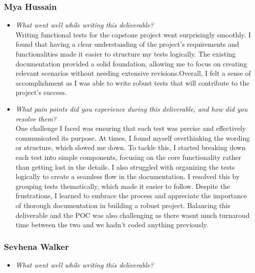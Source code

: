 \documentclass[12pt, titlepage]{article}
\begin{document}
\begin{appendices}
\subsubsection*{Mya Hussain}
\begin{itemize}
  \item \textit{What went well while writing this deliverable?} \\ 
  
  Writing functional tests for the capstone project went surprisingly 
  smoothly. I found that having a clear understanding of the project's 
  requirements and functionalities made it easier to structure my tests 
  logically. The existing documentation provided a solid foundation, 
  allowing me to focus on creating relevant scenarios without needing 
  extensive revisions.Overall, I felt a sense of accomplishment as I was able to
  write robust tests that will contribute to the project's 
  success.

  \item \textit{What pain points did you experience during this deliverable, and how did you resolve them?}\\ 
  
  One challenge I faced was ensuring that each test was precise and 
  effectively communicated its purpose. At times, I found myself 
  overthinking the wording or structure, which slowed me down. To 
  tackle this, I started breaking down each test into simple components, 
  focusing on the core functionality rather than getting lost in the 
  details. I also struggled with organizing the tests logically to 
  create a seamless flow in the documentation. I resolved this by 
  grouping tests thematically, which made it easier to follow. Despite 
  the frustrations, I learned to embrace the process and appreciate the 
  importance of thorough documentation in building a robust project. 
  Balancing this deliverable and the POC was also challenging as there 
  wasnt much turnaroud time between the two and we hadn't coded anything 
  previously.

\end{itemize}

\subsubsection*{Sevhena Walker}
\begin{itemize}
  \item \textit{What went well while writing this deliverable?} \\
  

\end{itemize}
\end{appendices}
\end{document}

